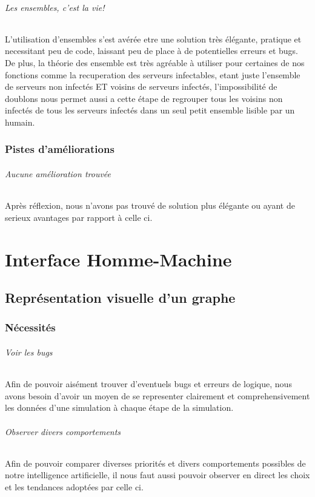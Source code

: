 \documentclass{scrreprt}
\begin{document}
    \paragraph{Les ensembles, c'est la vie!}
    L'utilisation d'ensembles s'est avérée etre une solution très élégante,
    pratique et necessitant peu de code, laissant peu de place à de
    potentielles erreurs et bugs.
    De plus, la théorie des ensemble est très agréable à utiliser pour
    certaines de nos fonctions comme la recuperation des serveurs
    infectables, etant juste l'ensemble de serveurs non infectés ET voisins
    de serveurs infectés, l'impossibilité de doublons nous permet aussi a
    cette étape de regrouper tous les voisins non infectés de tous les serveurs
    infectés dans un seul petit ensemble lisible par un humain.

    \section{Pistes d'améliorations}

    \paragraph{Aucune amélioration trouvée}
    Après réflexion, nous n'avons pas trouvé de solution plus élégante ou
    ayant de serieux avantages par rapport à celle ci.


    \part{Interface Homme-Machine}
    \chapter{Représentation visuelle d'un graphe}
    \section{Nécessités}

    \paragraph{Voir les bugs}
    Afin de pouvoir aisément trouver d'eventuels bugs et erreurs de logique,
    nous avons besoin d'avoir un moyen de se representer clairement et
    comprehensivement les données d'une simulation à chaque étape de la
    simulation.


    \paragraph{Observer divers comportements}
    Afin de pouvoir comparer diverses priorités et divers comportements
    possibles de notre intelligence artificielle, il nous faut aussi pouvoir
    observer en direct les choix et les tendances adoptées par celle ci.
\end{document}
